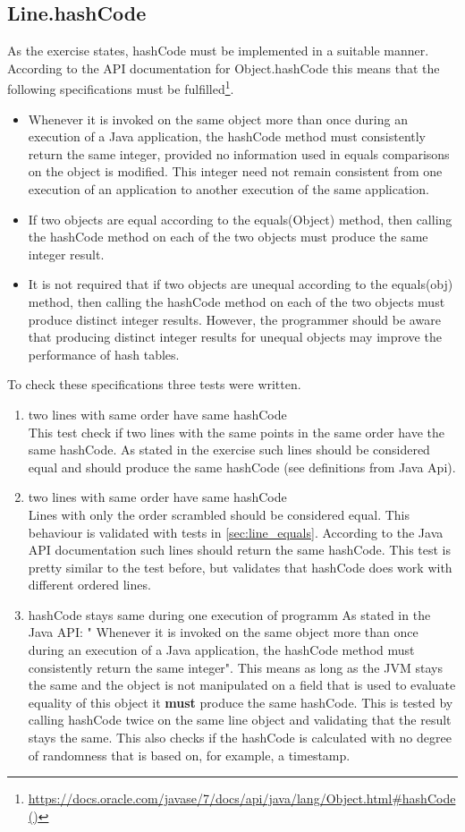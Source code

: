 \subsection{Line.hashCode}
As the exercise states, hashCode must be implemented in a suitable manner. According to the API documentation for Object.hashCode this means that the following specifications must be fulfilled\footnote{\url{https://docs.oracle.com/javase/7/docs/api/java/lang/Object.html#hashCode()}}.
\begin{itemize}
    \item Whenever it is invoked on the same object more than once during an execution of a Java application, the hashCode method must consistently return the same integer, provided no information used in equals comparisons on the object is modified. This integer need not remain consistent from one execution of an application to another execution of the same application.
    \item If two objects are equal according to the equals(Object) method, then calling the hashCode method on each of the two objects must produce the same integer result.
    \item It is not required that if two objects are unequal according to the equals(obj) method, then calling the hashCode method on each of the two objects must produce distinct integer results. However, the programmer should be aware that producing distinct integer results for unequal objects may improve the performance of hash tables.
\end{itemize}

To check these specifications three tests were written.
\begin{enumerate}
    \item two lines with same order have same hashCode \\
    This test check if two lines with the same points in the same order have the same hashCode. As stated in the exercise such lines should be considered equal and should produce the same hashCode (see definitions from Java Api).
    \item two lines with same order have same hashCode \\
    Lines with only the order scrambled should be considered equal. This behaviour is validated with tests in \ref{sec:line_equals}. According to the Java API documentation such lines should return the same hashCode. This test is pretty similar to the test before, but validates that hashCode does work with different ordered lines.
    \item hashCode stays same during one execution of programm
    As stated in the Java API: " Whenever it is invoked on the same object more than once during an execution of a Java application, the hashCode method must consistently return the same integer". This means as long as the JVM stays the same and the object is not manipulated on a field that is used to evaluate equality of this object it \textbf{must} produce the same hashCode. This is tested by calling hashCode twice on the same line object and validating that the result stays the same. This also checks if the hashCode is calculated with no degree of randomness that is based on, for example, a timestamp.
\end{enumerate}
